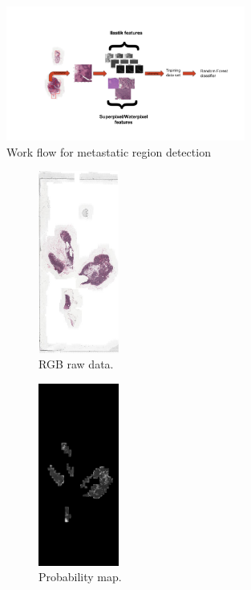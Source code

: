 \documentclass[a4paper,10pt,twocolumn]{article}
\begin{document}
\begin{figure}[!ht]
\centering
\includegraphics[width=0.7\textwidth]{workflowWithoutMil.png}
\caption{Work flow for metastatic region detection}
\label{fig:workflowCAM}
\end{figure}
\begin{figure}[!ht]
\centering
\begin{subfigure}{.33\textwidth}
  \centering
  \includegraphics[height=6cm]{Test_002_whole.png}
  \caption{RGB raw data.}
  \label{RawImage}
\end{subfigure}%
\begin{subfigure}{.33\textwidth}
  \centering
  \includegraphics[height=6cm]{whole_probmap_Test_002.png}
  \caption{Probability map.}
  \label{ProbabilityMapLocalMaxima}
\end{subfigure}
\begin{subfigure}{.33\textwidth}

\end{subfigure}
\end{figure}
\end{document}
